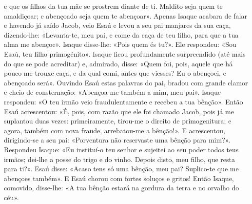 \begin{paracol}{2}
{e que os filhos da tua mãe se prostrem diante de ti. Maldito seja quem te amaldiçoar; e abençoado seja quem te abençoar». Apenas Isaque acabara de falar e havendo já saído Jacob, veio Esaú e levou a seu pai manjares da sua caça, dizendo-lhe: «Levanta-te, meu pai, e come da caça de teu filho, para que a tua alma me abençoe». Isaque disse-lhe: «Pois quem és tu?». Ele respondeu: «Sou Esaú, teu filho primogénito». Isaque ficou profundamente surpreendido (até mais do que se pode acreditar) e, admirado, disse: «Quem foi, pois, aquele que há pouco me trouxe caça, e da qual comi, antes que viesses? Eu o abençoei, e abençoado será». Ouvindo Esaú estas palavras do pai, bradou com grande clamor e cheio de consternação: «Abençoa-me também a mim, meu pai». Isaque respondeu: «O teu irmão veio fraudulentamente e recebeu a tua bênção». Então Esaú acrescentou: «É, pois, com razão que ele foi chamado Jacob, pois já me suplantou duas vezes: primeiramente, tirou-me o direito de primogenitura; e agora, também com nova fraude, arrebatou-me a bênção!». E acrescentou, dirigindo-se a seu pai: «Porventura não reservaste uma bênção para mim?». Respondeu Isaque: «Eu instituí-o teu senhor e sujeitei ao seu poder todos teus irmãos; dei-lhe a posse do trigo e do vinho. Depois disto, meu filho, que resta para ti?». Esaú disse: «Acaso tens só uma bênção, meu pai? Suplico-te que me abençoes também». E Esaú chorou com fortes soluços e gritos! Então Isaque, comovido, disse-lhe: «A tua bênção estará na gordura da terra e no orvalho do céu».
}\end{paracol}

\begin{paracol}{2}\switchcolumn{}\end{paracol}

